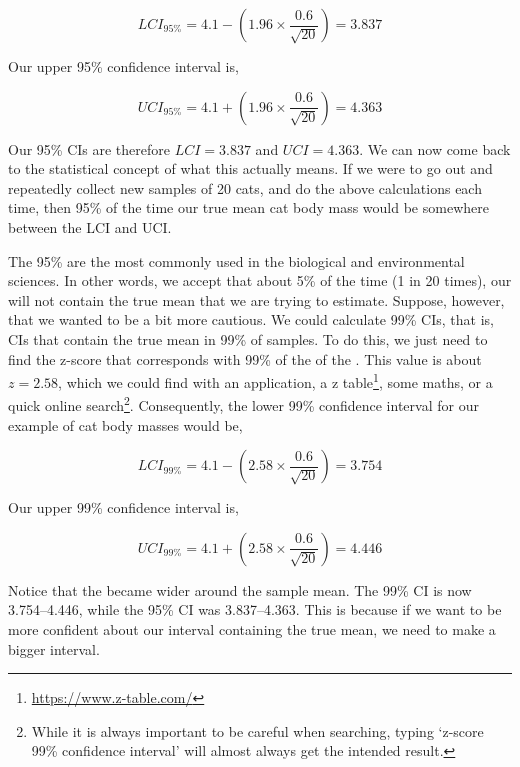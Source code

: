 \documentclass[
  openany]{krantz}
\renewcommand{\href}[2]{#2\footnote{\url{#1}}}
\begin{document}
\[LCI_{95\%} = 4.1 - \left(1.96 \times \frac{0.6}{\sqrt{20}}\right) = 3.837\]

Our upper 95\% confidence interval is,

\[UCI_{95\%} = 4.1 + \left(1.96 \times \frac{0.6}{\sqrt{20}}\right) = 4.363\]

Our 95\% CIs are therefore \(LCI = 3.837\) and \(UCI = 4.363\).
We can now come back to the statistical concept of what this actually means.
If we were to go out and repeatedly collect new samples of 20 cats, and do the above calculations each time, then 95\% of the time our true mean cat body mass would be somewhere between the LCI and UCI.

The 95\%  are the most commonly used in the biological and environmental sciences.
In other words, we accept that about 5\% of the time (1 in 20 times), our  will not contain the true mean that we are trying to estimate.
Suppose, however, that we wanted to be a bit more cautious.
We could calculate 99\% CIs, that is, CIs that contain the true mean in 99\% of samples.
To do this, we just need to find the z-score that corresponds with 99\% of the  of the .
This value is about \(z = 2.58\), which we could find with an  application, a \href{https://www.z-table.com/}{z table}, some maths, or a quick online search\footnote{While it is always important to be careful when searching, typing `z-score 99\% confidence interval' will almost always get the intended result.}.
Consequently, the lower 99\% confidence interval for our example of cat body masses would be,

\[LCI_{99\%} = 4.1 - \left(2.58 \times \frac{0.6}{\sqrt{20}}\right) = 3.754\]

Our upper 99\% confidence interval is,

\[UCI_{99\%} = 4.1 + \left(2.58 \times \frac{0.6}{\sqrt{20}}\right) = 4.446\]

Notice that the  became wider around the sample mean.
The 99\% CI is now 3.754--4.446, while the 95\% CI was 3.837--4.363.
This is because if we want to be more confident about our interval containing the true mean, we need to make a bigger interval.
\end{document}
